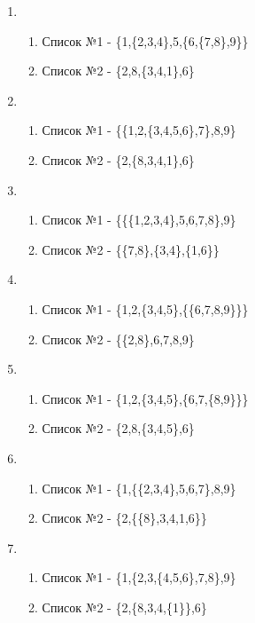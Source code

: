 \documentclass[a4paper,12pt]{article}
\begin{document}
\begin{enumerate}
	\item \begin{enumerate}
		\item Список №1 - \{1,\{2,3,4\},5,\{6,\{7,8\},9\}\}
		\item Список №2 - \{2,8,\{3,4,1\},6\}
	\end{enumerate}

	\item \begin{enumerate}
		\item Список №1 - \{\{1,2,\{3,4,5,6\},7\},8,9\}
		\item Список №2 - \{2,\{8,3,4,1\},6\}
	\end{enumerate}

	\item \begin{enumerate}
		\item Список №1 - \{\{\{1,2,3,4\},5,6,7,8\},9\}
		\item Список №2 - \{\{7,8\},\{3,4\},\{1,6\}\}
	\end{enumerate}

	\item \begin{enumerate}
		\item Список №1 - \{1,2,\{3,4,5\},\{\{6,7,8,9\}\}\}
		\item Список №2 - \{\{2,8\},6,7,8,9\}
	\end{enumerate}

	\item \begin{enumerate}
		\item Список №1 - \{1,2,\{3,4,5\},\{6,7,\{8,9\}\}\}
		\item Список №2 - \{2,8,\{3,4,5\},6\}
	\end{enumerate}

	\item \begin{enumerate}
		\item Список №1 - \{1,\{\{2,3,4\},5,6,7\},8,9\} 
		\item Список №2 - \{2,\{\{8\},3,4,1,6\}\}
	\end{enumerate}

	\item \begin{enumerate}
		\item Список №1 - \{1,\{2,3,\{4,5,6\},7,8\},9\}
		\item Список №2 - \{2,\{8,3,4,\{1\}\},6\}
	\end{enumerate}


\end{enumerate}
\end{document}
